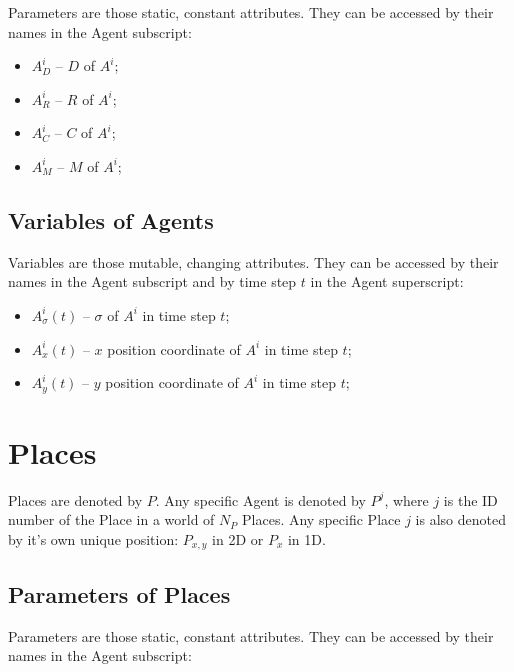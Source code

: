 \documentclass{article}
\begin{document}
\par Parameters are those static, constant attributes. They can be accessed by their names in the Agent subscript:

\begin{itemize}
    \item $A^{i}_{D}$ -- $D$ of $A^{i}$;
    \item $A^{i}_{R}$ -- $R$ of $A^{i}$;
    \item $A^{i}_{C}$ -- $C$ of $A^{i}$;
    \item $A^{i}_{M}$ -- $M$ of $A^{i}$;
\end{itemize}

\subsection{Variables of Agents}

\par Variables are those mutable, changing attributes. They can be accessed by their names in the Agent subscript and by time step $t$ in the Agent superscript:

\begin{itemize}
    \item $A^{i}_{\sigma}(t)$ -- $\sigma$ of $A^{i}$ in time step $t$;
    \item $A^{i}_{x}(t)$ -- $x$ position coordinate of $A^{i}$ in time step $t$;
    \item $A^{i}_{y}(t)$ -- $y$ position coordinate of $A^{i}$ in time step $t$;
\end{itemize}


\section{Places}

\par Places are denoted by $P$. Any specific Agent is denoted by $P^{j}$, where $j$ is the ID number of the Place in a world of $N_P$ Places. Any specific Place $j$ is also denoted by it's own unique position: $P_{x,y}$ in 2D or $P_{x}$ in 1D.

\subsection{Parameters of Places}

\par Parameters are those static, constant attributes. They can be accessed by their names in the Agent subscript:
\end{document}
